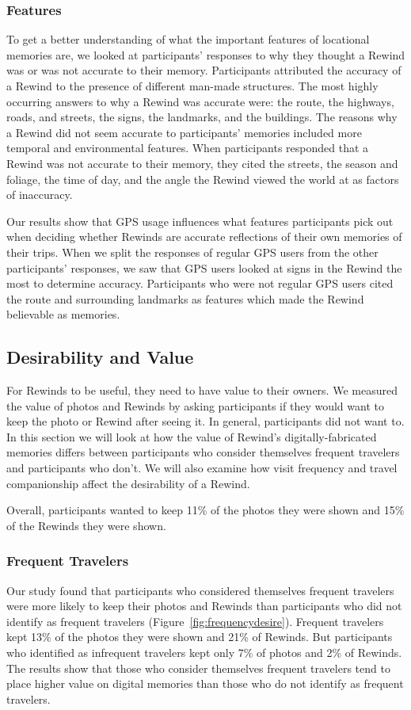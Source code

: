 \documentclass{sigchi}
\begin{document}
\subsubsection{Features}
To get a better understanding of what the important features of locational memories are, we looked at participants' responses to why they thought a Rewind was or was not accurate to their memory. Participants attributed the accuracy of a Rewind to the presence of different man-made structures. The most highly occurring answers to why a Rewind was accurate were: the route, the highways, roads, and streets, the signs, the landmarks, and the buildings. The reasons why a Rewind did not seem accurate to participants' memories included more temporal and environmental features. When participants responded that a Rewind was not accurate to their memory, they cited the streets, the season and foliage, the time of day, and the angle the Rewind viewed the world at as factors of inaccuracy.

Our results show that GPS usage influences what features participants pick out when deciding whether Rewinds are accurate reflections of their own memories of their trips. When we split the responses of regular GPS users from the other participants' responses, we saw that GPS users looked at signs in the Rewind the most to determine accuracy. Participants who were not regular GPS users cited the route and surrounding landmarks as features which made the Rewind believable as memories.

\subsection{Desirability and Value}
For Rewinds to be useful, they need to have value to their owners. We measured the value of photos and Rewinds by asking participants if they would want to keep the photo or Rewind after seeing it. In general, participants did not want to. In this section we will look at how the value of Rewind's digitally-fabricated memories differs between participants who consider themselves frequent travelers and participants who don't. We will also examine how visit frequency and travel companionship affect the desirability of a Rewind.

Overall, participants wanted to keep 11\% of the photos they were shown and 15\% of the Rewinds they were shown.

\subsubsection{Frequent Travelers}
Our study found that participants who considered themselves frequent travelers were more likely to keep their photos and Rewinds than participants who did not identify as frequent travelers (Figure~\ref{fig:frequencydesire}). Frequent travelers kept 13\% of the photos they were shown and 21\% of Rewinds. But participants who identified as infrequent travelers kept only 7\% of photos and 2\% of Rewinds. The results show that those who consider themselves frequent travelers tend to place higher value on digital memories than those who do not identify as frequent travelers.
\end{document}
